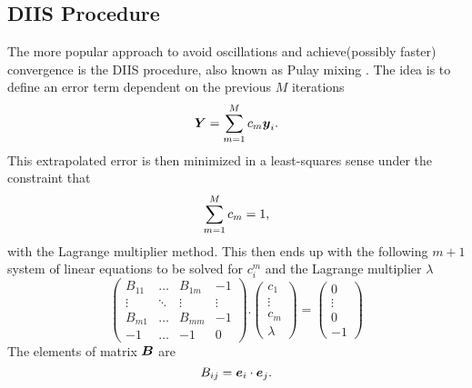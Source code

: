 \subsection{DIIS Procedure}
    The more popular approach to avoid oscillations and achieve(possibly
    faster) convergence is the DIIS procedure, also known as Pulay
    mixing \cite{PULAY,PULAY2}. The idea is to define an 
    error term dependent on the previous $M$ iterations
        \begin{equation}
            \blds{Y} = \suml{m=1}{M} c_m\blds{y}_i.
            \label{eq:errorDIISdef}
        \end{equation}
    This extrapolated error is then minimized in a least-squares sense under
    the constraint that
        \begin{equation}
            \suml{m=1}{M} c_m = 1,
        \end{equation}
    with the Lagrange multiplier method. This then ends up with the following
    $m+1$ system of linear equations to be solved for ${c}^{m}_i$ and the
    Lagrange multiplier $\lambda$
        \begin{equation}
            \begin{pmatrix}
                B_{11} & \dots & B_{1m} & -1 \\
                \vdots & \ddots & \vdots & \vdots \\
                B_{m1} & \dots & B_{mm} & -1 \\
                -1 & \dots & -1 & 0
            \end{pmatrix}.
            \begin{pmatrix}
                c_1 \\
                \vdots \\
                c_m \\
                \lambda
            \end{pmatrix}
            =
            \begin{pmatrix}
                0 \\
                \vdots \\
                0 \\
                -1
            \end{pmatrix}
        \end{equation}
    The elements of matrix $\blds{B}$ are
        \begin{equation}
            B_{ij} = \blds{e}_i \cdot \blds{e}_j.
        \end{equation}
